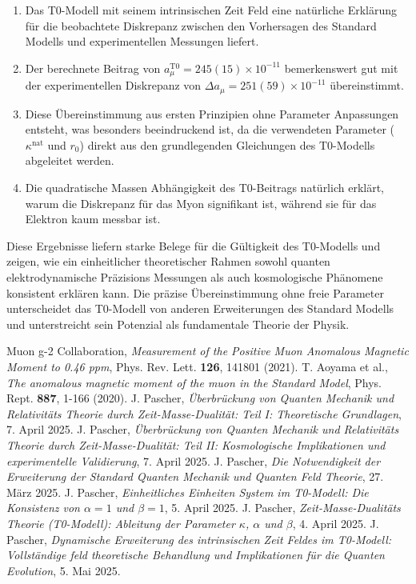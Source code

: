 \documentclass[12pt,a4paper]{article}
\begin{document}
	\begin{enumerate}
		\item Das T0-Modell mit seinem intrinsischen Zeit Feld eine natürliche Erklärung für die beobachtete Diskrepanz zwischen den Vorhersagen des Standard Modells und experimentellen Messungen liefert.
		
		\item Der berechnete Beitrag von $a_\mu^{\text{T0}} = 245(15) \times 10^{-11}$ bemerkenswert gut mit der experimentellen Diskrepanz von $\Delta a_\mu = 251(59) \times 10^{-11}$ übereinstimmt.
		
		\item Diese Übereinstimmung aus ersten Prinzipien ohne Parameter Anpassungen entsteht, was besonders beeindruckend ist, da die verwendeten Parameter ($\kappa^{\text{nat}}$ und $r_0$) direkt aus den grundlegenden Gleichungen des T0-Modells abgeleitet werden.
		
		\item Die quadratische Massen Abhängigkeit des T0-Beitrags natürlich erklärt, warum die Diskrepanz für das Myon signifikant ist, während sie für das Elektron kaum messbar ist.
	\end{enumerate}
	
	Diese Ergebnisse liefern starke Belege für die Gültigkeit des T0-Modells und zeigen, wie ein einheitlicher theoretischer Rahmen sowohl quanten elektrodynamische Präzisions Messungen als auch kosmologische Phänomene konsistent erklären kann. Die präzise Übereinstimmung ohne freie Parameter unterscheidet das T0-Modell von anderen Erweiterungen des Standard Modells und unterstreicht sein Potenzial als fundamentale Theorie der Physik.
	
	\begin{thebibliography}{99}
		 Muon g-2 Collaboration, \textit{Measurement of the Positive Muon Anomalous Magnetic Moment to 0.46 ppm}, Phys. Rev. Lett. \textbf{126}, 141801 (2021).
		 T. Aoyama et al., \textit{The anomalous magnetic moment of the muon in the Standard Model}, Phys. Rept. \textbf{887}, 1-166 (2020).
		 J. Pascher, \textit{Überbrückung von Quanten Mechanik und Relativitäts Theorie durch Zeit-Masse-Dualität: Teil I: Theoretische Grundlagen}, 7. April 2025.
		 J. Pascher, \textit{Überbrückung von Quanten Mechanik und Relativitäts Theorie durch Zeit-Masse-Dualität: Teil II: Kosmologische Implikationen und experimentelle Validierung}, 7. April 2025.
		 J. Pascher, \textit{Die Notwendigkeit der Erweiterung der Standard Quanten Mechanik und Quanten Feld Theorie}, 27. März 2025.
		 J. Pascher, \textit{Einheitliches Einheiten System im T0-Modell: Die Konsistenz von $\alpha = 1$ und $\beta = 1$}, 5. April 2025.
		 J. Pascher, \textit{Zeit-Masse-Dualitäts Theorie (T0-Modell): Ableitung der Parameter $\kappa$, $\alpha$ und $\beta$}, 4. April 2025.
		 J. Pascher, \textit{Dynamische Erweiterung des intrinsischen Zeit Feldes im T0-Modell: Vollständige feld theoretische Behandlung und Implikationen für die Quanten Evolution}, 5. Mai 2025.
	\end{thebibliography}
	
\end{document}
